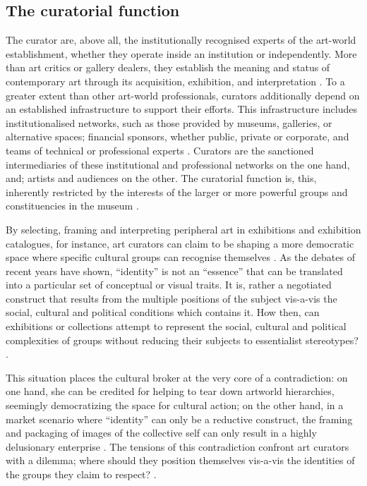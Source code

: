 \subsection{The curatorial function}
The curator are, above all, the institutionally recognised experts of the art-world establishment, whether they operate inside an institution or independently. More than art critics or gallery dealers, they establish the meaning and status of contemporary art through its acquisition, exhibition, and interpretation \autocite[p. 22]{Thi_book}. To a greater extent than other art-world professionals, curators additionally depend on an established infrastructure to support their efforts. This infrastructure includes institutionalised networks, such as those provided by museums, galleries, or alternative spaces; financial sponsors, whether public, private or corporate, and teams of technical or professional experts \autocite[p. 22]{Thi_book}. Curators are the sanctioned intermediaries of these institutional and professional networks on the one hand, and; artists and audiences on the other. The curatorial function is, this, inherently restricted by the interests of the larger or more powerful groups and constituencies in the museum \autocite[p. 22]{Thi_book}.

By selecting, framing and interpreting peripheral art in exhibitions and exhibition catalogues, for instance, art curators can claim to be shaping a more democratic space where specific cultural groups can recognise themselves \autocite[p. 23]{Thi_book}. As the debates of recent years have shown, “identity” is not an “essence” that can be translated into a particular set of conceptual or visual traits. It is, rather a negotiated construct that results from the multiple positions of the subject vis-a-vis the social, cultural and political conditions which contains it. How then, can exhibitions or collections attempt to represent the social, cultural and political complexities of groups without reducing their subjects to essentialist stereotypes? \autocite[p. 23]{Thi_book}.

This situation places the cultural broker at the very core of a contradiction: on one hand, she can be credited for helping to tear down artworld hierarchies, seemingly democratizing the space for cultural action; on the other hand, in a market scenario where “identity” can only be a reductive construct, the framing and packaging of images of the collective self can only result in a highly delusionary enterprise \autocite[p. 23-24]{Thi_book}. The tensions of this contradiction confront art curators with a dilemma; where should they position themselves vis-a-vis the identities of the groups they claim to respect? \autocite[p. 24]{Thi_book}.

